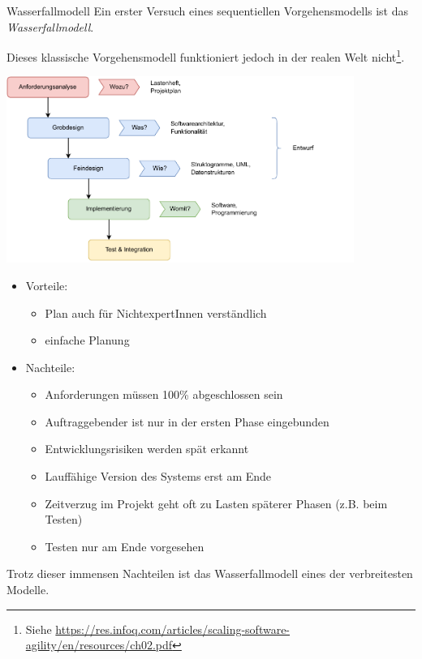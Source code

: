 \begin{defi}{Wasserfallmodell}
    Ein erster Versuch eines sequentiellen Vorgehensmodells ist das \emph{Wasserfallmodell}.

    Dieses klassische Vorgehensmodell funktioniert jedoch in der realen Welt nicht\footnote{Siehe \href{https://res.infoq.com/articles/scaling-software-agility/en/resources/ch02.pdf}{https://res.infoq.com/articles/scaling-software-agility/en/resources/ch02.pdf}}.

    \begin{center}
        \includegraphics[width=0.85\textwidth]{includes/figures/defi_waterfall_model.pdf}
    \end{center}

    \begin{itemize}
        \item Vorteile:
              \begin{itemize}
                  \item Plan auch für NichtexpertInnen verständlich
                  \item einfache Planung
              \end{itemize}
        \item Nachteile:
              \begin{itemize}
                  \item Anforderungen müssen 100\% abgeschlossen sein
                  \item Auftraggebender ist nur in der ersten Phase eingebunden
                  \item Entwicklungsrisiken werden spät erkannt
                  \item Lauffähige Version des Systems erst am Ende
                  \item Zeitverzug im Projekt geht oft zu Lasten späterer Phasen (z.B. beim Testen)
                  \item Testen nur am Ende vorgesehen
              \end{itemize}
    \end{itemize}

    Trotz dieser immensen Nachteilen ist das Wasserfallmodell eines der verbreitesten Modelle.
\end{defi}

